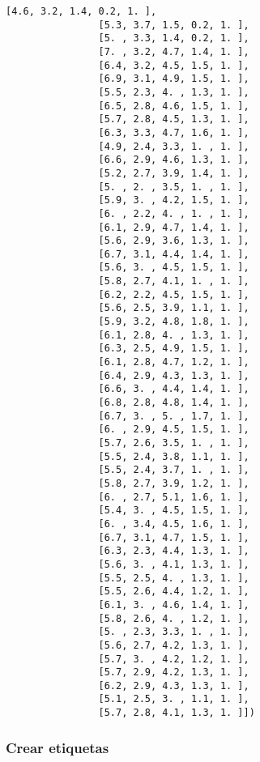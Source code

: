 \documentclass[11pt]{article}
\begin{document}
\begin{Verbatim}[commandchars=\\\{\}]
                [4.6, 3.2, 1.4, 0.2, 1. ],
                [5.3, 3.7, 1.5, 0.2, 1. ],
                [5. , 3.3, 1.4, 0.2, 1. ],
                [7. , 3.2, 4.7, 1.4, 1. ],
                [6.4, 3.2, 4.5, 1.5, 1. ],
                [6.9, 3.1, 4.9, 1.5, 1. ],
                [5.5, 2.3, 4. , 1.3, 1. ],
                [6.5, 2.8, 4.6, 1.5, 1. ],
                [5.7, 2.8, 4.5, 1.3, 1. ],
                [6.3, 3.3, 4.7, 1.6, 1. ],
                [4.9, 2.4, 3.3, 1. , 1. ],
                [6.6, 2.9, 4.6, 1.3, 1. ],
                [5.2, 2.7, 3.9, 1.4, 1. ],
                [5. , 2. , 3.5, 1. , 1. ],
                [5.9, 3. , 4.2, 1.5, 1. ],
                [6. , 2.2, 4. , 1. , 1. ],
                [6.1, 2.9, 4.7, 1.4, 1. ],
                [5.6, 2.9, 3.6, 1.3, 1. ],
                [6.7, 3.1, 4.4, 1.4, 1. ],
                [5.6, 3. , 4.5, 1.5, 1. ],
                [5.8, 2.7, 4.1, 1. , 1. ],
                [6.2, 2.2, 4.5, 1.5, 1. ],
                [5.6, 2.5, 3.9, 1.1, 1. ],
                [5.9, 3.2, 4.8, 1.8, 1. ],
                [6.1, 2.8, 4. , 1.3, 1. ],
                [6.3, 2.5, 4.9, 1.5, 1. ],
                [6.1, 2.8, 4.7, 1.2, 1. ],
                [6.4, 2.9, 4.3, 1.3, 1. ],
                [6.6, 3. , 4.4, 1.4, 1. ],
                [6.8, 2.8, 4.8, 1.4, 1. ],
                [6.7, 3. , 5. , 1.7, 1. ],
                [6. , 2.9, 4.5, 1.5, 1. ],
                [5.7, 2.6, 3.5, 1. , 1. ],
                [5.5, 2.4, 3.8, 1.1, 1. ],
                [5.5, 2.4, 3.7, 1. , 1. ],
                [5.8, 2.7, 3.9, 1.2, 1. ],
                [6. , 2.7, 5.1, 1.6, 1. ],
                [5.4, 3. , 4.5, 1.5, 1. ],
                [6. , 3.4, 4.5, 1.6, 1. ],
                [6.7, 3.1, 4.7, 1.5, 1. ],
                [6.3, 2.3, 4.4, 1.3, 1. ],
                [5.6, 3. , 4.1, 1.3, 1. ],
                [5.5, 2.5, 4. , 1.3, 1. ],
                [5.5, 2.6, 4.4, 1.2, 1. ],
                [6.1, 3. , 4.6, 1.4, 1. ],
                [5.8, 2.6, 4. , 1.2, 1. ],
                [5. , 2.3, 3.3, 1. , 1. ],
                [5.6, 2.7, 4.2, 1.3, 1. ],
                [5.7, 3. , 4.2, 1.2, 1. ],
                [5.7, 2.9, 4.2, 1.3, 1. ],
                [6.2, 2.9, 4.3, 1.3, 1. ],
                [5.1, 2.5, 3. , 1.1, 1. ],
                [5.7, 2.8, 4.1, 1.3, 1. ]])
\end{Verbatim}
            
    \subsubsection{Crear etiquetas}\label{crear-etiquetas}
\end{document}
